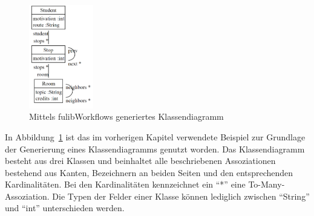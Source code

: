 \begin{figure}[ht]
    \centering
    \includegraphics[width=0.25\textwidth]{images/3.1.4/class_diagram}
    \caption{Mittels fulibWorkflows generiertes Klassendiagramm}
    \label{fig:generated-class}
\end{figure}

In Abbildung~\ref{fig:generated-class} ist das im vorherigen Kapitel verwendete Beispiel zur Grundlage der Generierung eines Klassendiagramms genutzt worden.
Das Klassendiagramm besteht aus drei Klassen und beinhaltet alle beschriebenen Assoziationen bestehend aus Kanten, Bezeichnern an beiden Seiten und den entsprechenden
Kardinalitäten.
Bei den Kardinalitäten kennzeichnet ein ``*'' eine To-Many-Assoziation.
Die Typen der Felder einer Klasse können lediglich zwischen ``String'' und ``int'' unterschieden werden.
